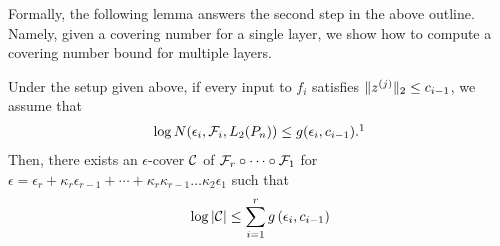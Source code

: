 Formally, the following lemma answers the second step in the above outline. Namely, given a covering number for a single layer, we show how to compute a covering number bound for multiple layers.
\begin{lemma}
    Under the setup given above, if every input to $f_i$ satisfies $\|z^{(j)}\|_2 \leq c_{i - 1}$, we assume that  
    \begin{align}
        \log N(\epsilon_i, \cF_i, L_2(P_n)) \leq g(\epsilon_i, c_{i - 1}).\footnotemark \label{lec10:eqn:single_cover_bound}
    \end{align}
    Then, there exists an $\epsilon$-cover $\mathcal C$ of $\mathcal F_r \circ \cdots \circ \mathcal F_1$ for $\epsilon = \epsilon_r + \kappa_r\epsilon_{r-1} + \cdots + \kappa_r\kappa_{r-1}\dots\kappa_2\epsilon_1$ such that
    \begin{align}
        \log \left\lvert\mathcal C\right\rvert \leq \sum_{i=1}^{r} g\left(\epsilon_i, c_{i-1}\right)
    \end{align}
    \label{lec10:lma:additive_cover}
\end{lemma}
